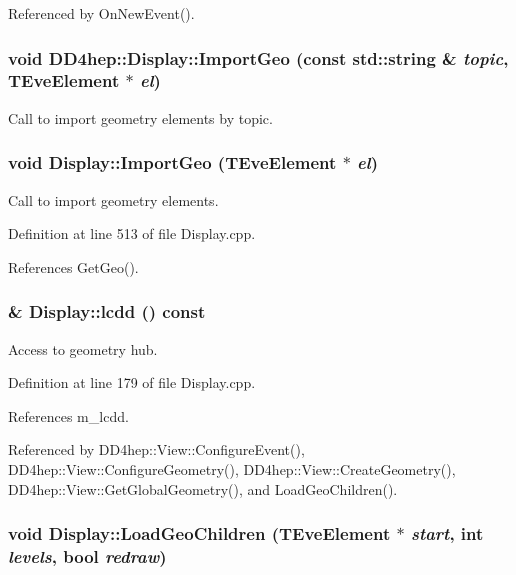 Referenced by OnNewEvent().\hypertarget{class_d_d4hep_1_1_display_a668a093fb0bb46c6d83a6ddea832be0e}{
\subsubsection[{ImportGeo}]{\setlength{\rightskip}{0pt plus 5cm}void DD4hep::Display::ImportGeo (const std::string \& {\em topic}, \/  TEveElement $\ast$ {\em el})}}
\label{class_d_d4hep_1_1_display_a668a093fb0bb46c6d83a6ddea832be0e}


Call to import geometry elements by topic. \hypertarget{class_d_d4hep_1_1_display_aca9678df816ec896a38ff9c31019fba2}{
\subsubsection[{ImportGeo}]{\setlength{\rightskip}{0pt plus 5cm}void Display::ImportGeo (TEveElement $\ast$ {\em el})}}
\label{class_d_d4hep_1_1_display_aca9678df816ec896a38ff9c31019fba2}


Call to import geometry elements. 

Definition at line 513 of file Display.cpp.

References GetGeo().\hypertarget{class_d_d4hep_1_1_display_a5c51efe89ea7d42489821f4f38c2b180}{
\subsubsection[{lcdd}]{ \& Display::lcdd () const}}
\label{class_d_d4hep_1_1_display_a5c51efe89ea7d42489821f4f38c2b180}


Access to geometry hub. 

Definition at line 179 of file Display.cpp.

References m\_\-lcdd.

Referenced by DD4hep::View::ConfigureEvent(), DD4hep::View::ConfigureGeometry(), DD4hep::View::CreateGeometry(), DD4hep::View::GetGlobalGeometry(), and LoadGeoChildren().\hypertarget{class_d_d4hep_1_1_display_a4432cbc091804b89436dd88dff8484f9}{
\subsubsection[{LoadGeoChildren}]{\setlength{\rightskip}{0pt plus 5cm}void Display::LoadGeoChildren (TEveElement $\ast$ {\em start}, \/  int {\em levels}, \/  bool {\em redraw})}}
\label{class_d_d4hep_1_1_display_a4432cbc091804b89436dd88dff8484f9}


